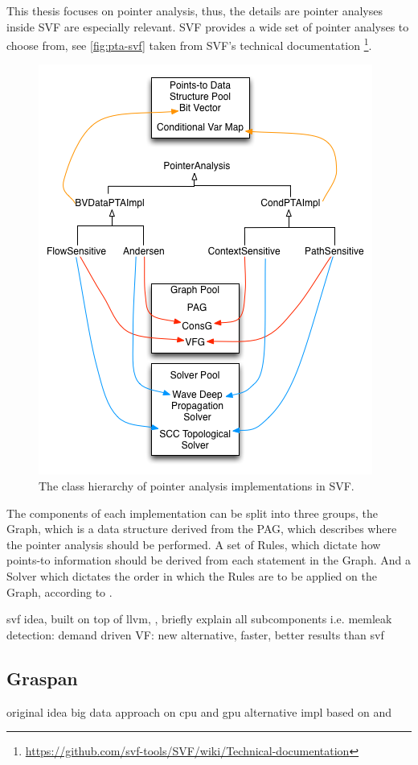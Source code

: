 This thesis focuses on pointer analysis, thus, the details are pointer analyses inside SVF are especially relevant. SVF provides a wide set of pointer analyses to choose from, see \autoref{fig:pta-svf} taken from SVF's technical documentation \footnote{\url{https://github.com/svf-tools/SVF/wiki/Technical-documentation}}.
\begin{figure}
    \centering
    \includegraphics[width=.7\textwidth]{img/pta-svf.png}
    \caption{The class hierarchy of pointer analysis implementations in SVF.}
    \label{fig:pta-svf}
\end{figure}
The components of each implementation can be split into three groups, the Graph, which is a data structure derived from the PAG, which describes where the pointer analysis should be performed.
A set of Rules, which dictate how points-to information should be derived from each statement in the Graph. And a Solver which dictates the order in which the Rules are to be applied on the Graph, according to \cite{sui2016svf}.


svf idea, built on top of llvm, \cite{sui2016svf}, briefly explain all subcomponents i.e. memleak detection: \cite{sui2014detecting} demand driven VF: \cite{sui2018value} new alternative, faster, better results than svf \cite{shi2018pinpoint}
\subsection{Graspan}
original idea \cite{zheng2008demand} big data approach on cpu \cite{wang2017graspan} and gpu \cite{zuo2021systemizing} alternative impl \cite{gu2020towards} based on \cite{mendez2012gpu} and \cite{mendez2010parallel}

